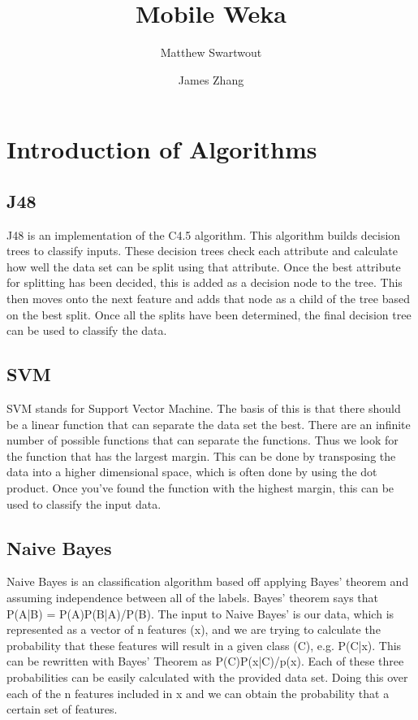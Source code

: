 \documentclass[]{article}
\title{Mobile Weka}
\author{Matthew Swartwout \and James Zhang}
\begin{document}
\maketitle

\section{Introduction of Algorithms}
\subsection{J48}
J48 is an implementation of the C4.5 algorithm. This algorithm builds decision trees to classify inputs. These decision trees check each attribute and calculate how well the data set can be split using that attribute. Once the best attribute for splitting has been decided, this is added as a decision node to the tree. This then moves onto the next feature and adds that node as a child of the tree based on the best split. Once all the splits have been determined, the final decision tree can be used to classify the data.
 
\subsection{SVM}
SVM stands for Support Vector Machine. The basis of this is that there should be a linear function that can separate the data set the best. There are an infinite number of possible functions that can separate the functions. Thus we look for the function that has the largest margin. This can be done by transposing the data into a higher dimensional space, which is often done by using the dot product. Once you've found the function with the highest margin, this can be used to classify the input data.

\subsection{Naive Bayes}
Naive Bayes is an classification algorithm based off applying Bayes' theorem and assuming independence between all of the labels. Bayes' theorem says that P(A|B) = P(A)P(B|A)/P(B). The input to Naive Bayes' is our data, which is represented as a vector of n features (x), and we are trying to calculate the probability that these features will result in a given class (C), e.g. P(C|x). This can be rewritten with Bayes' Theorem as P(C)P(x|C)/p(x). Each of these three probabilities can be easily calculated with the provided data set. Doing this over each of the n features included in x and we can obtain the probability that a certain set of features. 
\end{document}
